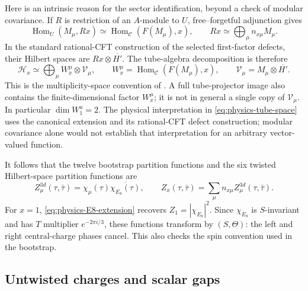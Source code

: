 Here is an intrinsic reason for the sector identification, beyond a
check of modular covariance. If $R$ is restriction of an $A$-module
to $U$, free--forgetful adjunction gives
\begin{equation}
 \operatorname{Hom}_{U}(M_\mu,Rx)
 \simeq\operatorname{Hom}_{\mathcal C}(F(M_\mu),x),
 \qquad
 Rx\simeq\bigoplus_\mu n_{x\mu}M_\mu.
 \label{eq:physics-adjunction}
\end{equation}
In the standard rational-CFT construction of the selected first-factor
defects, their Hilbert spaces are $Rx\otimes\overline{H'}$.
The tube-algebra decomposition is therefore
\begin{equation}
 \mathcal H_x
  \simeq\bigoplus_\mu W_x^\mu\otimes\mathcal V_\mu,
 \qquad
 W_x^\mu=\operatorname{Hom}_{\mathcal C}(F(M_\mu),x),
 \qquad
 \mathcal V_\mu=M_\mu\otimes\overline{H'}.
 \label{eq:physics-tube-space}
\end{equation}
This is the multiplicity-space convention of
\cite[Eq.~(4.1)]{LS}. A full tube-projector image also contains the
finite-dimensional factor $W_x^\mu$; it is not in general a single
copy of $\mathcal V_\mu$. In particular $\dim W_1^a=2$.
The physical interpretation in \eqref{eq:physics-tube-space} uses the
canonical extension and its rational-CFT defect construction; modular
covariance alone would not establish that interpretation for an
arbitrary vector-valued function.

It follows that the twelve bootstrap partition functions and the six
twisted Hilbert-space partition functions are
\begin{equation}
 Z_\mu^{3d}(\tau,\bar\tau)
   =\chi_\mu(\tau)\overline{\chi_{E_8}(\tau)},
 \qquad
 Z_x(\tau,\bar\tau)=\sum_\mu n_{x\mu}Z_\mu^{3d}(\tau,\bar\tau).
 \label{eq:physics-H3-sector-functions}
\end{equation}
For $x=1$, \eqref{eq:physics-E8-extension} recovers
$Z_1=|\chi_{E_8}|^2$. Since $\chi_{E_8}$ is $S$-invariant and has
$T$ multiplier $e^{-2\pi i/3}$, these functions transform by
$(S,\Theta)$: the left and right central-charge phases cancel.
This also checks the spin convention used in the bootstrap.

\subsection{Untwisted charges and scalar gaps}

